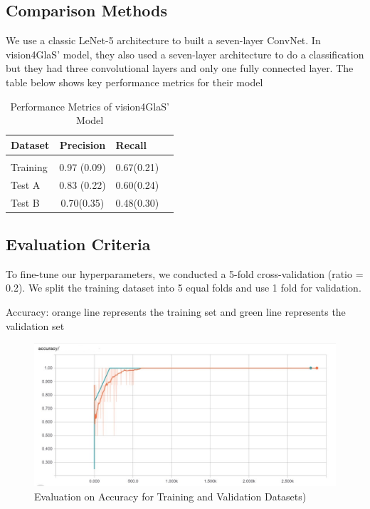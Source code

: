 \documentclass[twoside,11pt]{article}
\begin{document}
\subsection{Comparison Methods}
We use a classic LeNet-5 architecture to built a seven-layer ConvNet. In vision4GlaS' model\citep{8}, they also used a seven-layer architecture to do a classification but they had three convolutional layers and only one fully connected layer. The table below shows key performance metrics for their model

\begin{table}[htbp]
  \centering 
  \begin{tabular}{lclc} 
    Dataset & Precision & Recall \\ 
    \hline \\[-11pt]
    Training & 0.97 (0.09) & 0.67(0.21) \\ 
    Test A    & 0.83 (0.22) & 0.60(0.24) & \\
    Test B    &0.70(0.35) & 0.48(0.30) & \\ \hline
  \end{tabular}
  \label{tab:example} 
    \caption{Performance Metrics of vision4GlaS' Model} 
\end{table}


\subsection{Evaluation Criteria}
To fine-tune our hyperparameters, we conducted a 5-fold cross-validation (ratio = 0.2). We split the training dataset into 5 equal folds and use 1 fold for validation.

Accuracy: orange line represents the training set and green line represents the validation set

\begin{figure}[htbp]
\centering
\includegraphics[width=.8\textwidth]{figure5.jpg}
\caption{Evaluation on Accuracy for Training and Validation Datasets)}
\label{figure1}
\end{figure}
\end{document}
